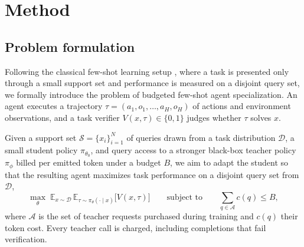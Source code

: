 \section{Method}\label{sec:method}

\subsection{Problem formulation}\label{sec:setting}

Following the classical few-shot learning setup
\citep{vinyals2016matching, snell2017prototypical, finn2017maml,
brown2020language}, where a task is presented only through a small
support set and performance is measured on a disjoint query set, we
formally introduce the problem of budgeted few-shot agent
specialization. An agent executes a trajectory
$\tau=(a_1,o_1,\ldots,a_H,o_H)$ of actions and environment
observations, and a task verifier $V(x,\tau)\in\{0,1\}$ judges
whether $\tau$ solves $x$.

\begin{definition}
\label{def:setting}
Given a support set $\mathcal{S}=\{x_i\}_{i=1}^{N}$ of queries drawn
from a task distribution $\mathcal{D}$, a small student policy
$\pi_{\theta_0}$, and query access to a stronger black-box teacher
policy $\pi_\phi$ billed per emitted token under a budget $B$, we
aim to adapt the student so that the resulting agent maximizes task
performance on a disjoint query set from $\mathcal{D}$,
\[
\max_{\theta}\;
\mathbb{E}_{x\sim\mathcal{D}}\,
\mathbb{E}_{\tau\sim\pi_\theta(\cdot\mid x)}\bigl[V(x,\tau)\bigr]
\qquad\text{subject to}\qquad
\textstyle\sum_{q\in\mathcal{A}}c(q)\le B,
\]
where $\mathcal{A}$ is the set of teacher requests purchased during
training and $c(q)$ their token cost. Every teacher call is charged,
including completions that fail verification.
\end{definition}

